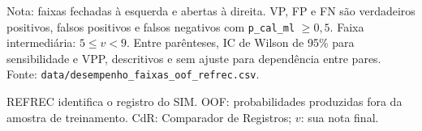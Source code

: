\begin{table}[!htbp]
\vspace{2pt}
\par\footnotesize Nota: faixas fechadas à esquerda e abertas à direita. VP, FP e FN são verdadeiros positivos, falsos positivos e falsos negativos com \texttt{p\_cal\_ml} $\geq 0{,}5$. Faixa intermediária: $5\leq v<9$. Entre parênteses, IC de Wilson de 95\% para sensibilidade e VPP, descritivos e sem ajuste para dependência entre pares. Fonte: \texttt{data/desempenho\_faixas\_oof\_refrec.csv}.
\par\footnotesize REFREC identifica o registro do SIM. OOF: probabilidades produzidas fora da amostra de treinamento. CdR: Comparador de Registros; $v$: sua nota final.
\end{table}
